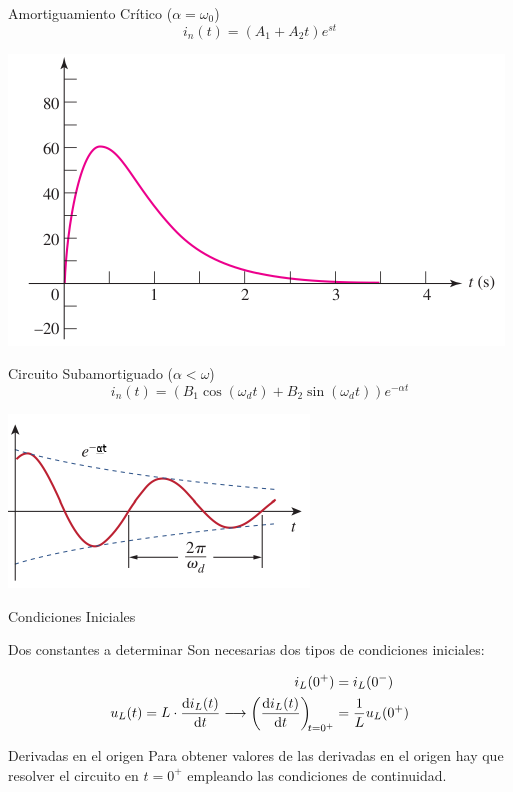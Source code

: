 \documentclass[aspectratio=169, usenames,svgnames,dvipsnames]{beamer}
\begin{document}
\begin{frame}[label={sec:org0a89d30}]{Amortiguamiento Crítico (\(\alpha = \omega_0\))}
\[
  \boxed{i_n(t) = (A_1 + A_2 t) e^{s t} }
\]
\begin{center}
\includegraphics[height=0.65\textheight]{../figs/AmortiguamientoCritico_HKD.pdf}
\end{center}
\end{frame}
\begin{frame}[label={sec:org6cc8968}]{Circuito Subamortiguado (\(\alpha < \omega\))}
\[
  \boxed{i_n(t) = (B_1\cos(\omega_d t) + B_2\sin(\omega_d t)) e^{-\alpha t}}
\]
\begin{center}
\includegraphics[height=0.65\textheight]{../figs/Subamortiguado_AS.pdf}
\end{center}
\end{frame}
\begin{frame}[label={sec:org2d10252}]{Condiciones Iniciales}
\begin{block}{Dos constantes a determinar}
Son necesarias dos tipos de condiciones iniciales:

\begin{align*}
  i_L(0^+) &= i_L(0^-)\\
  u_L(t) = L \cdot \diff{i_L(t)}{t} \longrightarrow   \diff{i_L(t)}{t}[t = 0^+] &= \frac{1}{L} u_L(0^+)
\end{align*}
\end{block}
\begin{block}{Derivadas en el origen}
Para obtener valores de las derivadas en el origen hay que resolver el circuito en \(t = 0^+\) empleando las condiciones de continuidad.
\end{block}
\end{frame}
\end{document}
